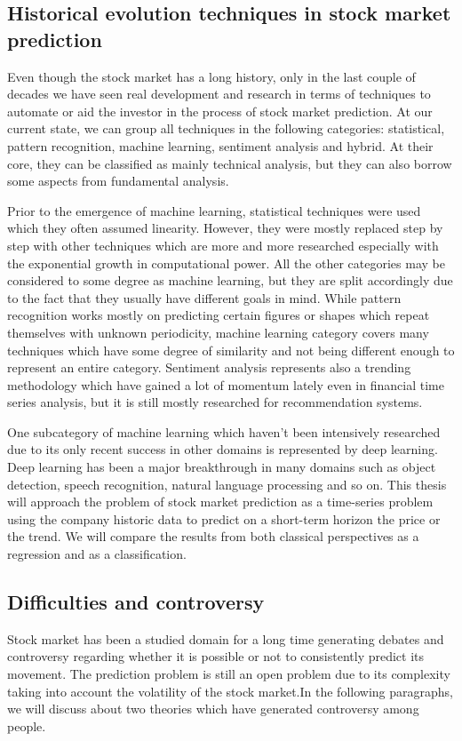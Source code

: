 \subsection{Historical evolution techniques in stock market prediction}
Even though the stock market has a long history, only in the last couple of decades we have seen real development and research in terms of techniques to automate or aid the investor in the process of stock market prediction. At our current state, we can group all techniques in the following categories: statistical, pattern recognition, machine learning, sentiment analysis and hybrid.\cite{shah2019stock} At their core, they can be classified as mainly technical analysis, but they can also borrow some aspects from fundamental analysis.

Prior to the emergence of machine learning, statistical techniques were used which they often assumed linearity. However, they were mostly replaced step by step with other techniques which are more and more researched especially with the exponential growth in computational power. All the other categories may be considered to some degree as machine learning, but they are split accordingly due to the fact that they usually have different goals in mind. While pattern recognition works mostly on predicting certain figures or shapes which repeat themselves with unknown periodicity, machine learning category covers many techniques which have some degree of similarity and not being different enough to represent an entire category. Sentiment analysis represents also a trending methodology which have gained a lot of momentum lately even in financial time series analysis, but it is still mostly researched for recommendation systems.

One subcategory of machine learning which haven't been intensively researched due to its only recent success in other domains is represented by deep learning. Deep learning has been a major breakthrough in many domains such as object detection, speech recognition, natural language processing and so on. This thesis will approach the problem of stock market prediction as a time-series problem using the company historic data to predict on a short-term horizon the price or the trend. We will compare the results from both classical perspectives as a regression and as a classification.

\subsection{Difficulties and controversy}
Stock market has been a studied domain for a long time generating debates and controversy regarding whether it is possible or not to consistently predict its movement. The prediction problem is still an open problem due to its complexity taking into account the volatility of the stock market.In the following paragraphs, we will discuss about two theories which have generated controversy among people.\\

